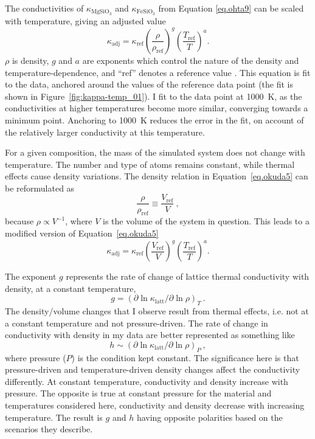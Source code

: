 The conductivities of $\kappa_{\mathrm{MgSiO_{3}}}$ and $\kappa_{\mathrm{FeSiO_{3}}}$ from Equation \ref{eq.ohta9} can be scaled with temperature, giving an adjusted value 
%
\begin{equation}
\kappa_{\mathrm{adj}}=\kappa_{\mathrm{ref}}\left ( \frac{\rho}{\rho_{\mathrm{ref}}} \right )^{g}\left ( \frac{T_{\mathrm{ref}}}{T} \right )^{a}.
\label{eq.okuda5}
\end{equation}
%
$\rho$ is density, $g$ and $a$ are exponents which control the nature of the density and temperature-dependence, and ``ref'' denotes a reference value \citep{Manthilake2011, Okuda2017}. This equation is fit to the data, anchored around the values of the reference data point (the fit is shown in Figure~\ref{fig:kappa-temp_01}). I fit to the data point at 1000~K, as the conductivities at higher temperatures become more similar, converging towards a minimum point. Anchoring to 1000~K reduces the error in the fit, on account of the relatively larger conductivity at this temperature.

For a given composition, the mass of the simulated system does not change with temperature. The number and type of atoms remains constant, while thermal effects cause density variations. The density relation in Equation~\ref{eq.okuda5} can be reformulated as
%
\begin{equation}
\frac{\rho }{\rho _{\mathrm{ref}}} \equiv \frac{V_{\mathrm{ref}}}{V} \ ,
\label{eq.rho_to_vol}
\end{equation}
%
because $\rho \propto V^{-1}$, where $V$ is the volume of the system in question. This leads to a modified version of Equation~\ref{eq.okuda5}
%
\begin{equation}
\kappa_{\mathrm{adj}}=\kappa_{\mathrm{ref}}\left ( \frac{V_{\mathrm{ref}}}{V} \right )^{g}\left ( \frac{T_{\mathrm{ref}}}{T} \right )^{a}.
\label{eq.okuda5mod}
\end{equation}

The exponent $g$ \citep{Manthilake2011} represents the rate of change of lattice thermal conductivity with density, at a constant temperature,
%
\begin{equation}
g=\left( \partial \ln \kappa_{\mathrm{latt}} / \partial \ln \rho \right) _{T} \ .
\label{eq.g_def}
\end{equation}
%
The density/volume changes that I observe result from thermal effects, i.e. not at a constant temperature and not pressure-driven. The rate of change in conductivity with density in my data are better represented as something like 
%
\begin{equation}
h \sim \left( \partial \ln \kappa_{\mathrm{latt}} / \partial \ln \rho \right) _{P} \ ,
\label{eq.g_def}
\end{equation}
%
where pressure ($P$) is the condition kept constant. The significance here is that pressure-driven and temperature-driven density changes affect the conductivity differently. At constant temperature, conductivity and density increase with pressure. The opposite is true at constant pressure for the material and temperatures considered here, conductivity and density decrease with increasing temperature. The result is $g$ and $h$ having opposite polarities based on the scenarios they describe.

